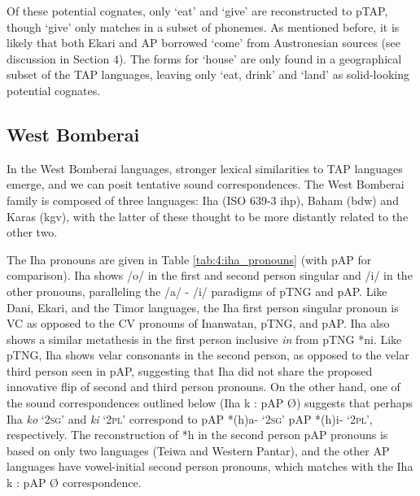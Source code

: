 Of these potential cognates, only `eat' and `give' are reconstructed to pTAP, though `give' only matches in a subset of phonemes. As mentioned before, it is likely that both Ekari and AP borrowed `come' from Austronesian sources (see discussion in Section 4). The forms for `house' are only found in a geographical subset of the TAP languages, leaving only `eat, drink' and `land' as solid-looking potential cognates.

\subsection{West Bomberai}
In the West Bomberai languages, stronger lexical similarities to TAP languages emerge, and we can posit tentative sound correspondences. The West Bomberai family is composed of three languages: Iha (ISO 639-3 ihp), Baham (bdw) and Karas (kgv), with the latter of these thought to be more distantly related to the other two.

The Iha pronouns are given in Table \ref{tab:4:iha_pronouns} (with pAP for comparison). Iha shows /o/ in the first and second person singular and /i/ in the other pronouns, paralleling the /a/ - /i/ paradigms of pTNG and pAP. Like Dani, Ekari, and the Timor languages, the Iha first person singular pronoun is VC as opposed to the CV pronouns of Inanwatan, pTNG, and pAP. Iha also shows a similar metathesis in the first person inclusive \textit{in} from pTNG *ni. Like pTNG, Iha shows velar consonants in the second person, as opposed to the velar third person seen in pAP, suggesting that Iha did not share the proposed innovative flip of second and third person pronouns. On the other hand, one of the sound correspondences outlined below (Iha k : pAP {\O}) suggests that perhaps Iha \textit{ko} `\textsc{2sg}' and \textit{ki} `\textsc{2pl}' correspond to pAP *(h)a- `\textsc{2sg}' pAP *(h)i- `\textsc{2pl}', respectively. The reconstruction of *h in the second person pAP pronouns is based on only two languages (Teiwa and Western Pantar),
and the other AP languages have vowel-initial second person pronouns, which matches with the Iha k : pAP {\O} correspondence.


